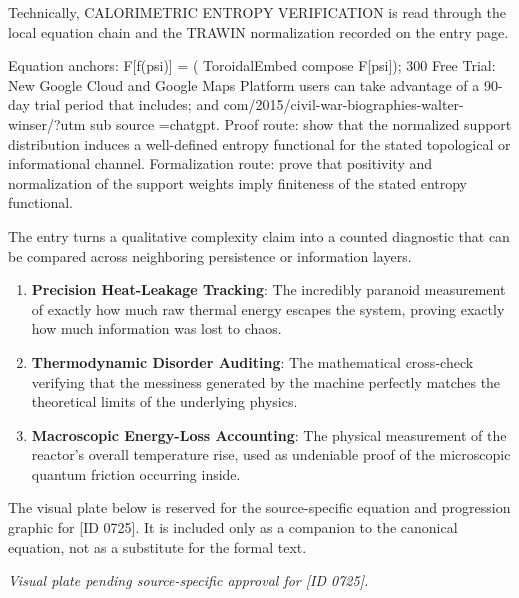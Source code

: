 Technically, CALORIMETRIC ENTROPY VERIFICATION is read through the local equation chain and the TRAWIN normalization recorded on the entry page.

Equation anchors: F[f(psi)] = ( ToroidalEmbed compose F[psi]); 300 Free Trial: New Google Cloud and Google Maps Platform users can take advantage of a 90-day trial period that includes; and com/2015/civil-war-biographies-walter-winser/?utm sub source =chatgpt. Proof route: show that the normalized support distribution induces a well-defined entropy functional for the stated topological or informational channel. Formalization route: prove that positivity and normalization of the support weights imply finiteness of the stated entropy functional.

The entry turns a qualitative complexity claim into a counted diagnostic that can be compared across neighboring persistence or information layers.
\endgroup

\begin{enumerate}[leftmargin=1.6em,itemsep=6pt,topsep=4pt]
\item \textbf{Precision Heat-Leakage Tracking}: The incredibly paranoid measurement of exactly how much raw thermal energy escapes the system, proving exactly how much information was lost to chaos.
\item \textbf{Thermodynamic Disorder Auditing}: The mathematical cross-check verifying that the messiness generated by the machine perfectly matches the theoretical limits of the underlying physics.
\item \textbf{Macroscopic Energy-Loss Accounting}: The physical measurement of the reactor's overall temperature rise, used as undeniable proof of the microscopic quantum friction occurring inside.
\end{enumerate}

\begingroup\footnotesize\sloppy
The visual plate below is reserved for the source-specific equation and progression graphic for [ID 0725]. It is included only as a companion to the canonical equation, not as a substitute for the formal text.
\par\endgroup
\begingroup\footnotesize\itshape
Visual plate pending source-specific approval for [ID 0725].
\par\endgroup


